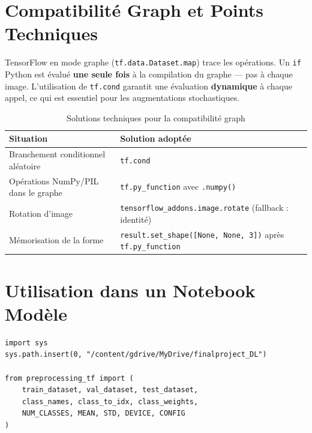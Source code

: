 \section{Compatibilité Graph et Points Techniques}

\begin{infobox}
  TensorFlow en mode graphe (\texttt{tf.data.Dataset.map}) trace les opérations. Un \texttt{if} Python est évalué \textbf{une seule fois} à la compilation du graphe — pas à chaque image. L'utilisation de \texttt{tf.cond} garantit une évaluation \textbf{dynamique} à chaque appel, ce qui est essentiel pour les augmentations stochastiques.
\end{infobox}

\begin{table}[h!]
  \centering
  \renewcommand{\arraystretch}{1.3}
  \begin{tabular}{p{5cm}p{8cm}}
    \toprule
    \textbf{Situation} & \textbf{Solution adoptée} \\
    \midrule
    Branchement conditionnel aléatoire & \texttt{tf.cond} \\
    Opérations NumPy/PIL dans le graphe & \texttt{tf.py\_function} avec \texttt{.numpy()} \\
    Rotation d'image & \texttt{tensorflow\_addons.image.rotate} (fallback : identité) \\
    Mémorisation de la forme & \texttt{result.set\_shape([None, None, 3])} après \texttt{tf.py\_function} \\
    \bottomrule
  \end{tabular}
  \caption{Solutions techniques pour la compatibilité graph}
\end{table}

\section{Utilisation dans un Notebook Modèle}

\begin{lstlisting}[caption={Import du module depuis un autre notebook}]
import sys
sys.path.insert(0, "/content/gdrive/MyDrive/finalproject_DL")

from preprocessing_tf import (
    train_dataset, val_dataset, test_dataset,
    class_names, class_to_idx, class_weights,
    NUM_CLASSES, MEAN, STD, DEVICE, CONFIG
)
\end{lstlisting}

